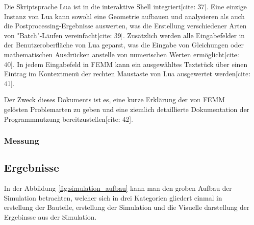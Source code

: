 Die Skriptsprache Lua ist in die interaktive Shell integriert[cite: 37]. Eine einzige Instanz von Lua kann sowohl eine Geometrie aufbauen und analysieren als auch die Postprocessing-Ergebnisse auswerten, was die Erstellung verschiedener Arten von "Batch"-Läufen vereinfacht[cite: 39]. Zusätzlich werden alle Eingabefelder in der Benutzeroberfläche von Lua geparst, was die Eingabe von Gleichungen oder mathematischen Ausdrücken anstelle von numerischen Werten ermöglicht[cite: 40]. In jedem Eingabefeld in FEMM kann ein ausgewähltes Textstück über einen Eintrag im Kontextmenü der rechten Maustaste von Lua ausgewertet werden[cite: 41].

Der Zweck dieses Dokuments ist es, eine kurze Erklärung der von FEMM gelösten Problemarten zu geben und eine ziemlich detaillierte Dokumentation der Programmnutzung bereitzustellen[cite: 42].


\subsubsection{Messung}
\label{sec:vorgehen:messung}

\subsection{Ergebnisse}
\label{sec:ergebnisse}

In der Abbildung \ref{fig:simulation_aufbau} kann man den groben Aufbau der Simulation betrachten, welcher sich in drei Kategorien gliedert einmal in erstellung der Bauteile, erstellung der Simulation und die Visuelle darstellung der Ergebinsse aus der Simulation.



